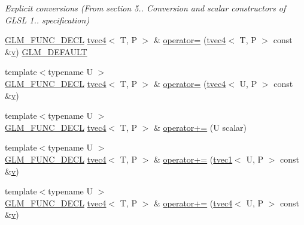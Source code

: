 \begin{DoxyCompactItemize}
\begin{DoxyCompactList}\small\item\em Explicit conversions (From section 5.. Conversion and scalar constructors of G\+L\+SL 1.. specification) \end{DoxyCompactList}\item 
\mbox{\hyperlink{setup_8hpp_ab2d052de21a70539923e9bcbf6e83a51}{G\+L\+M\+\_\+\+F\+U\+N\+C\+\_\+\+D\+E\+CL}} \mbox{\hyperlink{structglm_1_1tvec4}{tvec4}}$<$ T, P $>$ \& \mbox{\hyperlink{structglm_1_1tvec4_a0997bf645d42c36ec509712b8d3b9e56}{operator=}} (\mbox{\hyperlink{structglm_1_1tvec4}{tvec4}}$<$ T, P $>$ const \&\mbox{\hyperlink{glad_8h_a14cfbe2fc2234f5504618905b69d1e06}{v}}) \mbox{\hyperlink{setup_8hpp_aefce7051c376a64ba89fa93a9f63bc2c}{G\+L\+M\+\_\+\+D\+E\+F\+A\+U\+LT}}
\item 
{\footnotesize template$<$typename U $>$ }\\\mbox{\hyperlink{setup_8hpp_ab2d052de21a70539923e9bcbf6e83a51}{G\+L\+M\+\_\+\+F\+U\+N\+C\+\_\+\+D\+E\+CL}} \mbox{\hyperlink{structglm_1_1tvec4}{tvec4}}$<$ T, P $>$ \& \mbox{\hyperlink{structglm_1_1tvec4_ac0decc5432f220ec3026a99866ee356d}{operator=}} (\mbox{\hyperlink{structglm_1_1tvec4}{tvec4}}$<$ U, P $>$ const \&\mbox{\hyperlink{glad_8h_a14cfbe2fc2234f5504618905b69d1e06}{v}})
\item 
{\footnotesize template$<$typename U $>$ }\\\mbox{\hyperlink{setup_8hpp_ab2d052de21a70539923e9bcbf6e83a51}{G\+L\+M\+\_\+\+F\+U\+N\+C\+\_\+\+D\+E\+CL}} \mbox{\hyperlink{structglm_1_1tvec4}{tvec4}}$<$ T, P $>$ \& \mbox{\hyperlink{structglm_1_1tvec4_a68b20faded17ea18abdd3f3210df9d72}{operator+=}} (U scalar)
\item 
{\footnotesize template$<$typename U $>$ }\\\mbox{\hyperlink{setup_8hpp_ab2d052de21a70539923e9bcbf6e83a51}{G\+L\+M\+\_\+\+F\+U\+N\+C\+\_\+\+D\+E\+CL}} \mbox{\hyperlink{structglm_1_1tvec4}{tvec4}}$<$ T, P $>$ \& \mbox{\hyperlink{structglm_1_1tvec4_a0bb5ea385459a6ce515301cc4ee02368}{operator+=}} (\mbox{\hyperlink{structglm_1_1tvec1}{tvec1}}$<$ U, P $>$ const \&\mbox{\hyperlink{glad_8h_a14cfbe2fc2234f5504618905b69d1e06}{v}})
\item 
{\footnotesize template$<$typename U $>$ }\\\mbox{\hyperlink{setup_8hpp_ab2d052de21a70539923e9bcbf6e83a51}{G\+L\+M\+\_\+\+F\+U\+N\+C\+\_\+\+D\+E\+CL}} \mbox{\hyperlink{structglm_1_1tvec4}{tvec4}}$<$ T, P $>$ \& \mbox{\hyperlink{structglm_1_1tvec4_a640fd04b14ab0540880eb905da18351a}{operator+=}} (\mbox{\hyperlink{structglm_1_1tvec4}{tvec4}}$<$ U, P $>$ const \&\mbox{\hyperlink{glad_8h_a14cfbe2fc2234f5504618905b69d1e06}{v}})

\end{DoxyCompactItemize}
